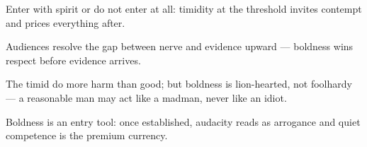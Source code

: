 

\begin{distilled}
  \item Enter with spirit or do not enter at all: timidity at the threshold invites contempt and prices everything after.
  \item Audiences resolve the gap between nerve and evidence upward --- boldness wins respect before evidence arrives.
  \item The timid do more harm than good; but boldness is lion-hearted, not foolhardy --- a reasonable man may act like a madman, never like an idiot.
  \item Boldness is an entry tool: once established, audacity reads as arrogance and quiet competence is the premium currency.
\end{distilled}
